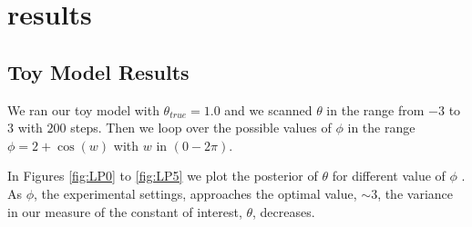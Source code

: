 \documentclass[10pt,journal,compsoc]{IEEEtran}
\begin{document}
%



\section{results}
\subsection{Toy Model Results}
We ran our toy model with $\theta_{true}=1.0$ and we scanned $\theta$ in the range from $-3$ to $3$ with $200$ steps. Then we loop over the possible values of $\phi$ in the range $ \phi = 2+\cos(w)$ with $w$ in $(0-2\pi)$.

In Figures \ref{fig:LP0} to \ref{fig:LP5} we plot the posterior of $\theta$ for different value of $\phi$ . As $\phi$, the experimental settings, approaches the optimal value,  $\sim 3$, the variance in our measure of the constant of interest, $\theta$, decreases.
\end{document}
